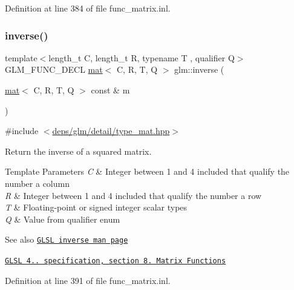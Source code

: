Definition at line 384 of file func\+\_\+matrix.\+inl.

\mbox{\label{group__core__func__matrix_gace61e11fc177491beeca0c6971e2f3fc}} 
\subsubsection{\texorpdfstring{inverse()}{inverse()}}
{\footnotesize\ttfamily template$<$length\+\_\+t C, length\+\_\+t R, typename T , qualifier Q$>$ \\
G\+L\+M\+\_\+\+F\+U\+N\+C\+\_\+\+D\+E\+CL \hyperlink{structglm_1_1mat}{mat}$<$ C, R, T, Q $>$ glm\+::inverse (\begin{DoxyParamCaption}\item[{\hyperlink{structglm_1_1mat}{mat}$<$ C, R, T, Q $>$ const \&}]{m }\end{DoxyParamCaption})}



{\ttfamily \#include $<$\hyperlink{type__mat_8hpp}{deps/glm/detail/type\+\_\+mat.\+hpp}$>$}

Return the inverse of a squared matrix.


\begin{DoxyTemplParams}{Template Parameters}
{\em C} & Integer between 1 and 4 included that qualify the number a column \\
\hline
{\em R} & Integer between 1 and 4 included that qualify the number a row \\
\hline
{\em T} & Floating-\/point or signed integer scalar types \\
\hline
{\em Q} & Value from qualifier enum\\
\hline
\end{DoxyTemplParams}
\begin{DoxySeeAlso}{See also}
\href{http://www.opengl.org/sdk/docs/manglsl/xhtml/inverse.xml}{\tt G\+L\+SL inverse man page} 

\href{http://www.opengl.org/registry/doc/GLSLangSpec.4.20.8.pdf}{\tt G\+L\+SL 4.. specification, section 8. Matrix Functions} 
\end{DoxySeeAlso}


Definition at line 391 of file func\+\_\+matrix.\+inl.

\mbox{\label{group__core__func__matrix_gaf14569404c779fedca98d0b9b8e58c1f}} 

